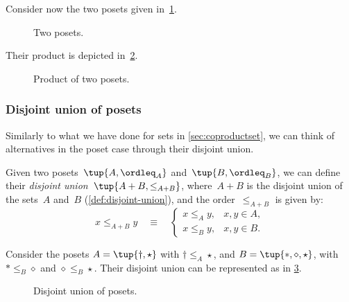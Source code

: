 \begin{example}
Consider now the two posets given in~\cref{fig:composing_posets_1}.
\begin{figure}[h!]
\begin{center}
\end{center}
\caption{Two posets. \label{fig:composing_posets_1}}
\end{figure}
Their product is depicted in~\cref{fig:composing_posets_2}.
\begin{figure}[h!]
\begin{center}
\end{center}
\caption{Product of two posets. \label{fig:composing_posets_2}}
\end{figure}
\end{example}

\subsubsection{Disjoint union of posets}

Similarly to what we have done for sets in \cref{sec:coproductset}, we can think of alternatives in the poset case through their disjoint union.

\begin{definition}
Given two posets~$\tup{A, \ordleq_A} $ and~$\tup{B, \ordleq_B}$, we can define their \emph{disjoint union}~$\tup{ A + B, \leq_{A + B}}$, where~$A + B$
is the disjoint union of the sets~$A$ and~$B$ (\cref{def:disjoint-union}), and the
order~$\leq_{A + B}$ is given by:
\begin{equation}
    x \leq_{A + B} y \quad\equiv\quad
    \begin{cases}
        x \leq_A y, & x,y \in A, \\
        x \leq_B y, & x,y \in B.
    \end{cases}
\end{equation}
\end{definition}


\begin{example}
Consider the posets $A=\tup{\dagger, \star}$ with $\dagger \leq_A \star$, and $B=\tup{\ast,\diamond,\star}$, with $\ast \leq_B \diamond$ and $\diamond \leq_B \star$. Their disjoint union can be represented as in \cref{fig:poset-coproduct}.

\begin{figure}[h!]
    \centering
    \caption{Disjoint union of posets. \label{fig:poset-coproduct}}
\end{figure}
\end{example}

